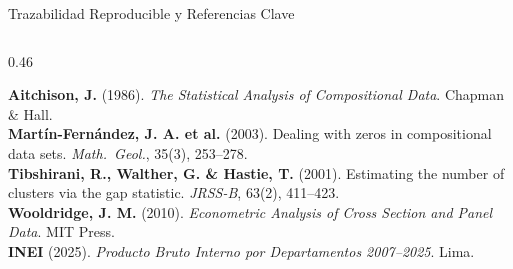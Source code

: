 \begin{frame}{Trazabilidad Reproducible y Referencias Clave}
\begin{columns}[T,onlytextwidth]
\begin{column}{0.46\textwidth}
\begin{ccdebox}[left=2mm,right=2mm,top=1mm,bottom=1mm]
\textbf{Aitchison, J.} \textcolor{ccdemid}{(1986)}. \textit{The Statistical Analysis of Compositional Data}. Chapman \& Hall.\\[0.06cm]
\textbf{Martín-Fernández, J. A. et al.} \textcolor{ccdemid}{(2003)}. Dealing with zeros in compositional data sets. \textit{Math.\ Geol.}, 35(3), 253--278.\\[0.06cm]
\textbf{Tibshirani, R., Walther, G. \& Hastie, T.} \textcolor{ccdemid}{(2001)}. Estimating the number of clusters via the gap statistic. \textit{JRSS-B}, 63(2), 411--423.\\[0.06cm]
\textbf{Wooldridge, J. M.} \textcolor{ccdemid}{(2010)}. \textit{Econometric Analysis of Cross Section and Panel Data}. MIT Press.\\[0.06cm]
\textbf{INEI} \textcolor{ccdemid}{(2025)}. \textit{Producto Bruto Interno por Departamentos 2007--2025}. Lima.
\end{ccdebox}
\end{column}
\end{columns}
\end{frame}